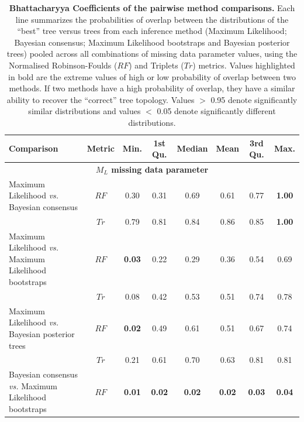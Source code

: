 \begin{landscape}
\begin{table}[!htb]
\caption[Bhattacharyya Coefficients of the pairwise method comparisons ($M_{L}$ and $M_{F}$)]{\footnotesize{\textbf{Bhattacharyya Coefficients of the pairwise method comparisons.}
Each line summarizes the probabilities of overlap between the distributions of the ``best'' tree versus trees from each inference method (Maximum Likelihood; Bayesian consensus; Maximum Likelihood bootstraps and Bayesian posterior trees) pooled across all combinations of missing data parameter values, using the Normalised Robinson-Foulds ($RF$) and Triplets ($Tr$) metrics. 
Values highlighted in bold are the extreme values of high or low probability of overlap between two methods. If two methods have a high probability of overlap, they have a similar ability to recover the ``correct'' tree topology.
Values $>$ 0.95 denote significantly similar distributions and values $<$ 0.05 denote significantly different distributions.}} %
\label{Tab_Supp_summary_BC_ML_MF}
\centering
\begin{tabular}{lccccccc}
  \hline
 Comparison &  Metric & Min. & 1st Qu. & Median & Mean & 3rd Qu. & Max. \\ 
  \hline
  \multicolumn{8}{c}{\textbf{$M_{L}$ missing data parameter}}\\
  \hline
    Maximum Likelihood \textit{vs.} Bayesian consensus                 & $RF$ & 0.30 & 0.31 & 0.69 & 0.61 & 0.77 & \textbf{1.00} \\ 
                                                                       & $Tr$ & 0.79 & 0.81 & 0.84 & 0.86 & 0.85 & \textbf{1.00} \\ 
    Maximum Likelihood \textit{vs.} Maximum Likelihood bootstraps      & $RF$ & \textbf{0.03} & 0.22 & 0.29 & 0.36 & 0.54 & 0.69 \\ 
                                                                       & $Tr$ & 0.08 & 0.42 & 0.53 & 0.51 & 0.74 & 0.78 \\ 
    Maximum Likelihood \textit{vs.} Bayesian posterior trees           & $RF$ & \textbf{0.02} & 0.49 & 0.61 & 0.51 & 0.67 & 0.74 \\ 
                                                                       & $Tr$ & 0.21 & 0.61 & 0.70 & 0.63 & 0.81 & 0.81 \\ 
    Bayesian consensus \textit{vs.} Maximum Likelihood bootstraps      & $RF$ & \textbf{0.01} & \textbf{0.02} & \textbf{0.02} & \textbf{0.02} & \textbf{0.03} & \textbf{0.04} \\ 

\end{tabular}
\end{table}
\end{landscape}
